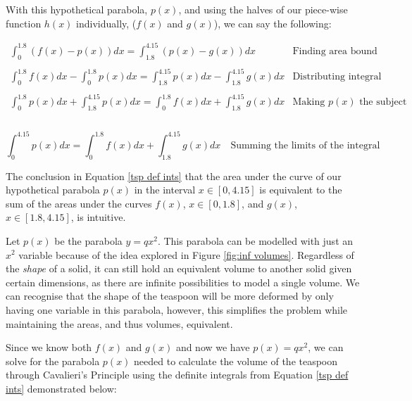 \documentclass[12pt]{article}
\begin{document}
With this hypothetical parabola, $p(x)$, and using the halves of our piece-wise function $h(x)$ individually, ($f(x)$ and $g(x)$), we can say the following:

$$
\begin{array}{l|c}
    \int_0^{1.8}{(f(x)-p(x))}dx = \int_{1.8}^{4.15}{(p(x)-g(x))}dx & \text{Finding area bound} \\ \\
    \int_0^{1.8}{f(x)}dx - \int_0^{1.8}{p(x)}dx = \int_{1.8}^{4.15}{p(x)}dx - \int_{1.8}^{4.15}{g(x)}dx & \text{Distributing integral} \\ \\
    \int_0^{1.8}{p(x)}dx + \int_{1.8}^{4.15}{p(x)}dx = \int_0^{1.8}{f(x)}dx +\int_{1.8}^{4.15}{g(x)}dx & \text{Making } p(x) \text{ the subject}\\ \\
 \end{array}
$$

\vspace{-8mm}

\begin{equation}\label{tsp def ints}
    \boxed{\int_{0}^{4.15}{p(x)}dx = \int_0^{1.8}{f(x)}dx +\int_{1.8}^{4.15}{g(x)}dx}  \quad \text{Summing the limits of the integral}
\end{equation}

The conclusion in Equation \ref{tsp def ints} that the area under the curve of our hypothetical parabola $p(x)$ in the interval $x \in [0,4.15]$ is equivalent to the sum of the areas under the curves $f(x)$, $x \in [0,1.8]$, and $g(x)$, $x \in [1.8,4.15]$, is intuitive. 

Let $p(x)$ be the parabola $y=qx^2$. This parabola can be modelled with just an $x^2$ variable because of the idea explored in Figure \ref{fig:inf volumes}. Regardless of the \textit{shape} of a solid, it can still hold an equivalent volume to another solid given certain dimensions, as there are infinite possibilities to model a single volume. We can recognise that the shape of the teaspoon will be more deformed by only having one variable in this parabola, however, this simplifies the problem while maintaining the areas, and thus volumes, equivalent. 

Since we know both $f(x)$ and $g(x)$ and now we have $p(x)=qx^2$, we can solve for the parabola $p(x)$ needed to calculate the volume of the teaspoon through Cavalieri's Principle using the definite integrals from Equation \ref{tsp def ints} demonstrated below:
\end{document}
